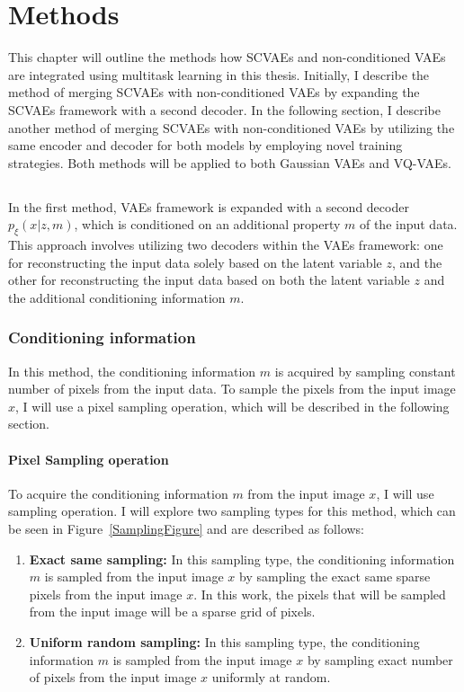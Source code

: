 \chapter{Methods}

This chapter will outline the methods how SCVAEs and non-conditioned VAEs are
integrated using multitask learning in this thesis. Initially, I describe the
method of merging SCVAEs with non-conditioned VAEs by expanding the SCVAEs
framework with a second decoder. In the following section, I describe another method of
merging SCVAEs with non-conditioned VAEs by utilizing the same encoder and
decoder for both models by employing novel training strategies. Both methods will be applied to both Gaussian VAEs and VQ-VAEs.


\section{}

In the first method, VAEs framework is expanded with a second decoder
$p_\xi(x|z,m)$, which is conditioned on an additional property $m$ of the input
data. This approach involves utilizing two decoders within the VAEs framework:
one for reconstructing the input data solely based on the latent variable $z$,
and the other for reconstructing the input data based on both the latent
variable $z$ and the additional conditioning information $m$.

\subsection{Conditioning information}

In this method, the conditioning information $m$ is acquired by sampling
constant number of pixels from the input data. To sample the pixels from the
input image $x$, I will use a pixel sampling operation, which will be
described in the following section.

\subsubsection{Pixel Sampling operation}

To acquire the conditioning information $m$ from the input image $x$, I will
use sampling operation. I will explore two sampling types for this method,
which can be seen in Figure~\ref{SamplingFigure} and are described as follows:

\begin{enumerate}
    \item \textbf{Exact same sampling:} In this sampling type, the conditioning information $m$ is sampled from the input image $x$ by sampling the exact same sparse pixels from the input image $x$. In this work, the pixels that will be sampled from the input image will be a sparse grid of pixels.
    \item \textbf{Uniform random sampling:} In this sampling type, the conditioning information $m$ is sampled from the input image $x$ by sampling exact number of pixels from the input image $x$ uniformly at random.
\end{enumerate}

